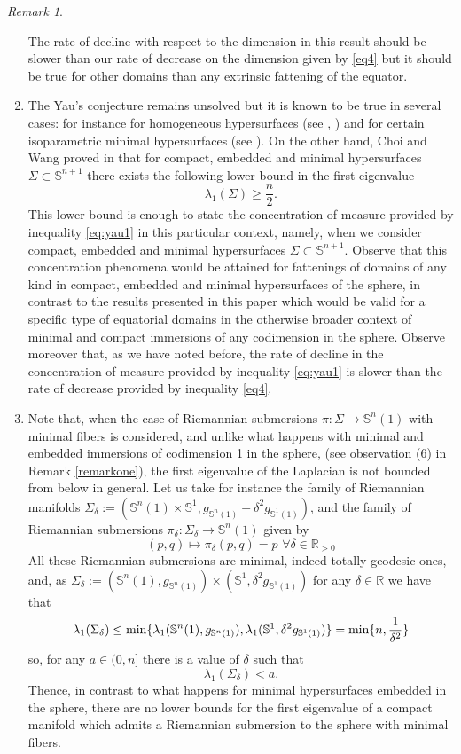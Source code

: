 \documentclass[11pt,letterpaper]{amsart}
\theoremstyle{definition}
\theoremstyle{remark}
\newtheorem{remark}[theorem]{Remark}
\newcommand{\erre}{\mathbb{R}}
\newcommand{\ese}{\mathbb{S}}
\begin{document}
\begin{remark}
\begin{enumerate}
The rate of decline with respect to the dimension in this result  should be slower than our rate of decrease on the dimension given by \eqref{eq4} but it should be true for other domains than any extrinsic fattening of the equator.
\medskip

\item The Yau's conjecture remains unsolved but it is known to be true in several  cases: for instance for homogeneous hypersurfaces (see \cite{MR0742598}, \cite{MR0814078}) and for certain isoparametric minimal hypersurfaces (see \cite{MR3080491}).   On the other hand, Choi and Wang proved in \cite{Choi1983559} that for compact, embedded  and minimal hypersurfaces $\Sigma\subset\mathbb{S}^{n+1}$ there exists the following lower bound in the first eigenvalue
$$\lambda_1(\Sigma)\geq \frac{n}{2}.$$
This lower bound is enough to state the concentration of measure provided by inequality \eqref{eq:yau1} in this particular context, namely, when we consider compact, embedded  and minimal hypersurfaces $\Sigma\subset\mathbb{S}^{n+1}$. Observe  that this concentration phenomena would be attained for fattenings of domains of any kind in compact, embedded and minimal hypersurfaces of the sphere, in contrast to the results presented in this paper which would be valid for a specific type of equatorial domains in the otherwise broader context of minimal and compact immersions of any codimension in the sphere. Observe moreover that, as we have noted before, the  rate of decline in the concentration of measure provided by inequality \eqref{eq:yau1}  is slower than the rate of decrease provided  by  inequality \eqref{eq4}.
\item Note that, when the case of Riemannian submersions $\pi: \Sigma \rightarrow \ese^n(1)$ with minimal fibers is considered, and unlike what happens with minimal and embedded immersions of codimension 1 in the sphere, (see observation (6) in Remark \ref{remarkone}), the first eigenvalue of the Laplacian is not bounded from below in general. 
Let us take for instance the family of Riemannian manifolds $\Sigma_\delta:=(\mathbb{S}^n(1)\times \mathbb{S}^1, g_{\mathbb{S}^{n}(1)}+\delta^2 g_{\mathbb{S}^{1}(1)})$, and the family of Riemannian submersions $\pi_\delta: \Sigma_\delta \rightarrow \ese^n(1)$ given by
$$
(p,q)\mapsto \pi_\delta(p,q)=p \,\,\forall \delta \in \erre_{>0}
$$
All these Riemannian submersions are minimal, indeed totally geodesic ones, and, as $\Sigma_\delta:=(\mathbb{S}^n(1),g_{\mathbb{S}^{n}(1)}) \times (\mathbb{S}^1,\delta^2g_{\mathbb{S}^{1}(1)})$  for any $\delta \in \erre$ we have that
$$\lambda_1(\Sigma_\delta)\leq {\rm min}\{\lambda_1(\mathbb{S}^n(1),g_{\mathbb{S}^{n}(1)}),\lambda_1(\mathbb{S}^1,\delta^2g_{\mathbb{S}^{1}(1)})\}={\rm min}\{n, \frac{1}{\delta^2}\}$$
\noindent so, for any $a\in (0,n]$ there is a value of $\delta$ such that
$$
\lambda_1(\Sigma_\delta)<a.
$$
Thence, in contrast to what happens for minimal hypersurfaces embedded in the sphere, there are no lower bounds for the first eigenvalue of a compact manifold which admits a Riemannian submersion to the sphere with minimal fibers.
\end{enumerate}
\end{remark}
\end{document}
